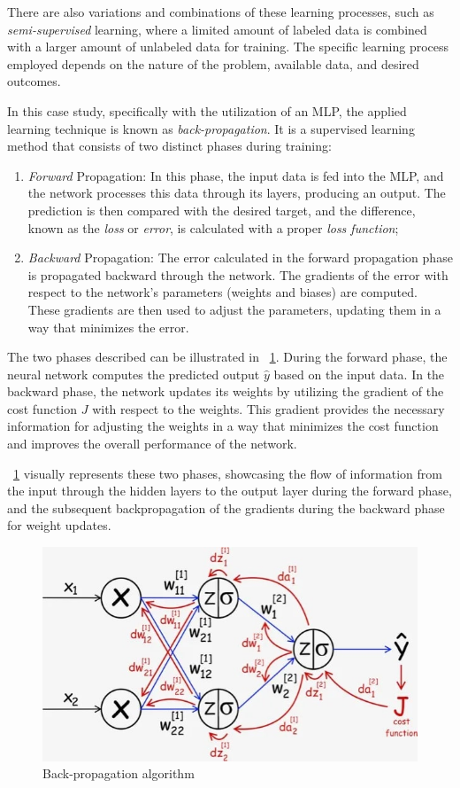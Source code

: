 There are also variations and combinations of these learning processes, such as \textit{semi-supervised} learning, where a limited amount of labeled data is combined with a larger amount of unlabeled data for training. The specific learning process employed depends on the nature of the problem, available data, and desired outcomes.

In this case study, specifically with the utilization of an MLP, the applied learning technique is known as \textit{back-propagation}. It is a supervised learning method that consists of two distinct phases during training:
\begin{enumerate}
	\item \textit{Forward} Propagation: In this phase, the input data is fed into the MLP, and the network processes this data through its layers, producing an output. The prediction is then compared with the desired target, and the difference, known as the \textit{loss} or \textit{error}, is calculated with a proper \textit{loss function};
	\item \textit{Backward} Propagation: The error calculated in the forward propagation phase is propagated backward through the network. The gradients of the error with respect to the network's parameters (weights and biases) are computed. These gradients are then used to adjust the parameters, updating them in a way that minimizes the error.
\end{enumerate}

The two phases described can be illustrated in \Fig~\ref{fig:backprop}. During the forward phase, the neural network computes the predicted output $\hat{y}$ based on the input data. In the backward phase, the network updates its weights by utilizing the gradient of the cost function $J$ with respect to the weights. This gradient provides the necessary information for adjusting the weights in a way that minimizes the cost function and improves the overall performance of the network.

\Fig~\ref{fig:backprop} visually represents these two phases, showcasing the flow of information from the input through the hidden layers to the output layer during the forward phase, and the subsequent backpropagation of the gradients during the backward phase for weight updates.

\begin{figure}[h]
	\centering
	\includegraphics[width=0.5\linewidth]{ImageFiles/NeuralNetworks/backprop}
	\caption{Back-propagation algorithm \cite{UIBASP}}
	\label{fig:backprop}
\end{figure}

